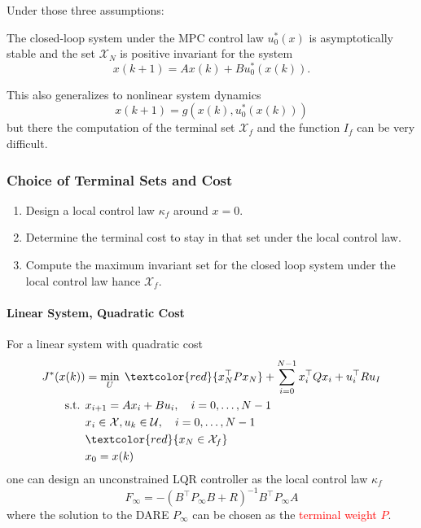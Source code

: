\newpar{}
Under those three assumptions:

The closed-loop system under the MPC control law $u_0^*(x)$ is asymptotically stable and the set $\mathcal{X}_N$ is positive invariant for the system
\begin{equation*}
    x(k+1) = Ax(k) + Bu_0^*(x(k)).
\end{equation*}

This also generalizes to nonlinear system dynamics
\begin{equation*}
    x(k+1) = g(x(k),u_0^*(x(k)))
\end{equation*}
but there the computation of the terminal set $\mathcal{X}_f$ and the function $I_f$ can be very difficult.


\subsubsection{Choice of Terminal Sets and Cost}

\begin{enumerate}
    \item Design a local control law $\kappa_f$ around $x=0$.
    \item Determine the terminal cost to stay in that set under the local control law.
    \item Compute the maximum invariant set for the closed loop system under the local control law hance $\mathcal{X}_f$.
\end{enumerate}

\paragraph{Linear System, Quadratic Cost}
For a linear system with quadratic cost
\begin{align*}
    J^*(x(k))    & = \min_{U} \;\textcolor{red}{x^\top_N P x_N} + \sum_{i=0}^{N-1} x_i^\top Q x_i + u_i^\top R u_I \\
    \text{s.t. } & x_{i+1} = Ax_i + Bu_i, \quad i = 0, \ldots, N-1                                                 \\
                 & x_i \in \mathcal{X}, u_k \in \mathcal{U}, \quad i = 0, \ldots, N-1                              \\
                 & \textcolor{red}{x_N \in \mathcal{X}_f}                                                          \\
                 & x_0 = x(k)
\end{align*}
one can design an unconstrained LQR controller as the local control law $\kappa_f$
\begin{equation*}
    F_\infty = -{\left(B^\top P_\infty B + R\right)}^{-1} B^\top P_\infty A
\end{equation*}
where the solution to the DARE $P_\infty$ can be chosen as the \textcolor{red}{terminal weight $P$}.

